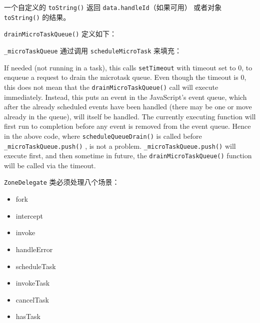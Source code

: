 一个自定义的 \texttt{toString()} 返回 \texttt{data.handleId}（如果可用）
或者对象 \texttt{toString()} 的结果。





\texttt{drainMicroTaskQueue()} 定义如下：




\texttt{\_microTaskQueue} 通过调用 \texttt{scheduleMicroTask} 来填充：



If needed (not running in a task), this calls
\texttt{setTimeout}
with timeout set to 0, to
enqueue a request to drain the microtask queue. Even though the timeout is 0, this
does not mean that the
\texttt{drainMicroTaskQueue()}
call will execute immediately.
Instead, this puts an event in the JavaScript’s event queue, which after the already
scheduled events have been handled (there may be one or move already in the
queue), will itself be handled. The currently executing function will first run to
completion before any event is removed from the event queue. Hence in the above
code, where
\texttt{scheduleQueueDrain()}
is called before
\texttt{\_microTaskQueue.push()}
, is not
a problem.
\texttt{\_microTaskQueue.push()}
will execute first, and then sometime in future,
the
\texttt{drainMicroTaskQueue()}
function will be called via the timeout.


\texttt{ZoneDelegate} 类必须处理八个场景：

\begin{itemize}
  \item fork
  \item intercept
  \item invoke
  \item handleError
  \item scheduleTask
  \item invokeTask
  \item cancelTask
  \item hasTask
\end{itemize}


